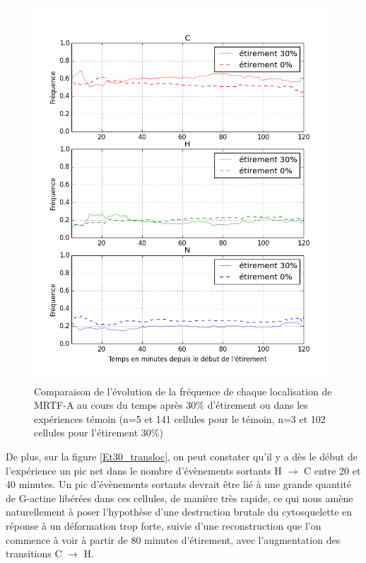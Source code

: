 \documentclass{report}
\begin{document}
\begin{figure}
\includegraphics[scale=0.5]{Figures/Etirement30_vs_0_dynamique.png} 
\caption{\label{Et30_CHN} Comparaison de l'évolution de la fréquence de chaque localisation de MRTF-A au cours du temps après 30\% d'étirement ou dans les expériences témoin (n=5 et 141 cellules pour le témoin, n=3 et 102 cellules pour l'étirement 30\%)}
\end{figure}

De plus, sur la figure \ref{Et30_transloc}, on peut constater qu'il y a dès le début de l'expérience un pic net dans le nombre d'évènements sortants H $\rightarrow$ C entre 20 et 40 minutes. 
Un pic d'évènements sortants devrait être lié à une grande quantité de G-actine libérées dans ces cellules, de manière très rapide, ce qui nous amène naturellement à poser l'hypothèse d'une destruction brutale du cytosquelette en réponse à un déformation trop forte, suivie d'une reconstruction que l'on commence à voir à partir de 80 minutes d'étirement, avec l'augmentation des transitions C $\rightarrow$ H. 
\end{document}

